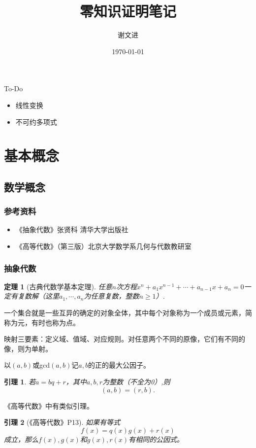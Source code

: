 \documentclass[10pt]{ctexart}
\title{零知识证明笔记}
\author{谢文进}
\date{\today}
\newtheorem{lemma}{引理}
\newtheorem{theorem}{定理}
\begin{document}
\maketitle

{\color{blue}To-Do}
\begin{itemize}
	\item 线性变换
	\item 不可约多项式
\end{itemize}

\section{基本概念}
\subsection{数学概念}
\subsubsection{参考资料}
\begin{itemize}
	\item 《抽象代数》张贤科 { } 清华大学出版社
	\item 《高等代数》（第三版）北京大学数学系几何与代数教研室
\end{itemize}

\subsubsection{抽象代数}
\begin{theorem}[古典代数学基本定理]
	任意$n$次方程$x^n+a_1x^{n-1}+ \cdots + a_{n-1}x + a_n = 0$一定有复数解（这里$a_1, \cdots, a_n$为任意复数，整数$n \ge 1$）.
\end{theorem}

一个{\color{blue}集合}就是一些互异的确定的对象全体，其中每个对象称为一个成员或元素，简称为元，有时也称为点。

{\color{blue}映射三要素}：定义域、值域、对应规则。对任意两个不同的原像，它们有不同的像，则为{\color{blue}单射}。

以$(a,b)$或gcd$(a,b)$记$a,b$的正的最大公因子。
\begin{lemma}\label{lemma:abqr}
	若$a=bq+r$，其中$a,b,r$为整数（不全为0）,则
	$$
	(a,b)=(r,b).
	$$
\end{lemma}
《高等代数》中有类似引理。
\begin{lemma}[《高等代数》P13]
	如果有等式
	\begin{equation}
		f(x) = q(x)g(x)+r(x)
	\end{equation}
	成立，那么$f(x),g(x)$和$g(x),r(x)$有相同的公因式。
\end{lemma}
\end{document}
